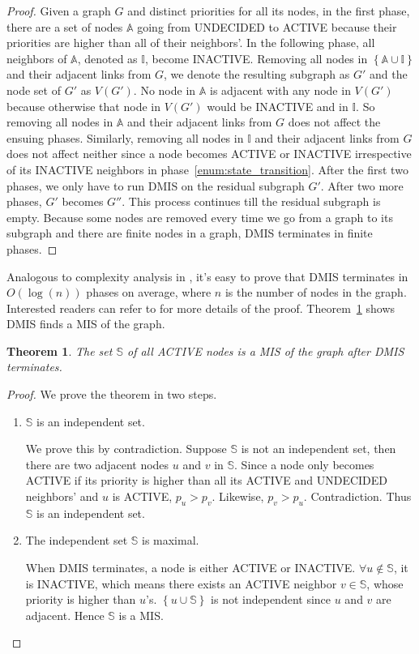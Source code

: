 \documentclass[conference]{IEEEtran}
\newtheorem{theorem}{Theorem}
\begin{document}
\begin{proof}
Given a graph $G$ and distinct priorities for all its nodes, in the first phase, there are a set of nodes $\mathbb{A}$ going from UNDECIDED to ACTIVE because their priorities are higher than all of their neighbors'. In the following phase, all neighbors of $\mathbb{A}$, denoted as $\mathbb{I}$, become INACTIVE. Removing all nodes in $\left \{ {\mathbb{A} \cup \mathbb{I}} \right\}$ and their adjacent links from $G$, we denote the resulting subgraph as $G'$ and the node set of $G'$ as $V(G')$. No node in $\mathbb{A}$ is adjacent with any node in $V(G')$ because otherwise that node in $V(G')$ would be INACTIVE and in $\mathbb{I}$. So removing all nodes in $\mathbb{A}$ and their adjacent links from $G$ does not affect the ensuing phases. Similarly, removing all nodes in $\mathbb{I}$ and their adjacent links from $G$ does not affect neither since a node becomes ACTIVE or INACTIVE irrespective of its INACTIVE neighbors in phase~\ref{enum:state_transition}. After the first two phases, we only have to run DMIS on the residual subgraph $G'$. After two more phases, $G'$ becomes $G''$. This process continues till the residual subgraph is empty. Because some nodes are removed every time we go from a graph to its subgraph and there are finite nodes in a graph, DMIS terminates in finite phases.
\end{proof}
Analogous to complexity analysis in \cite{fastmisv2}, it's easy to prove that DMIS terminates in $O(\log(n))$ phases on average, where $n$ is the number of nodes in the graph. Interested readers can refer to \cite{fastmisv2} for more details of the proof. Theorem~\ref{theorem:dmiscorrect} shows DMIS finds a MIS of the graph.
\begin{theorem}		\label{theorem:dmiscorrect}
The set $\mathbb{S}$ of all ACTIVE nodes is a MIS of the graph after DMIS terminates.
\end{theorem}
\begin{proof}
We prove the theorem in two steps. 
\begin{enumerate}
	\item $\mathbb{S}$ is an independent set. 
	
	We prove this by contradiction. Suppose $\mathbb{S}$ is not an independent set, then there are two adjacent nodes $u$ and $v$ in $\mathbb{S}$. Since a node only becomes ACTIVE if its priority is higher than all its ACTIVE and UNDECIDED neighbors' and $u$ is ACTIVE, $p_u > p_v$. Likewise, $p_v > p_u$. Contradiction. Thus $\mathbb{S}$ is an independent set.
	\item The independent set $\mathbb{S}$ is maximal. 


	When DMIS terminates, a node is either ACTIVE or INACTIVE. $\forall u \not \in \mathbb{S}$, it is INACTIVE, which means there exists an ACTIVE neighbor $v \in \mathbb{S}$, whose priority is higher than $u$'s. $\left \{ {u \cup \mathbb{S}} \right\}$ is not independent since $u$ and $v$ are adjacent. Hence $\mathbb{S}$ is a MIS.
\end{enumerate}
\end{proof}
\end{document}
